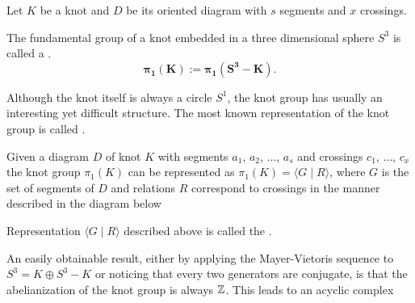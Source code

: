 Let $K$ be a knot and $D$ be its oriented diagram with $s$ segments and $x$ crossings. 
\begin{definition} 
  The fundamental group of a knot embedded in a three dimensional sphere $S^3$ is called a .
  $$\mathbf{\pi_1(K):=\pi_1(S^3-K)}.
  $$
\end{definition}
Although the knot itself is always a circle $S^1$, the knot group has usually an interesting yet difficult structure. The most known representation of the knot group is called .

\begin{definition}
  Given a diagram $D$ of knot $K$ with segments $a_1$, $a_2$, ..., $a_s$ and crossings $c_1$, ..., $c_x$ the knot group $\pi_1(K)$ can be represented as $\pi_1(K)=\langle G\;|\;R\rangle$, where $G$ is the set of segments of $D$ and relations $R$ correspond to crossings in the manner described in the diagram below
  \begin{center}
  \end{center}
  Representation $\langle G\;|\;R\rangle$ described above is called the  \cite[Chapter~6]{livingstone}.
\end{definition}

An easily obtainable result, either by applying the Mayer-Vietoris sequence to $S^3=K\oplus S^3-K$ or noticing that every two generators are conjugate, is that the abelianization of the knot group is always $\operatorname{\mathbb{Z}}$. This leads to an acyclic complex
\begin{center}
\end{center}

